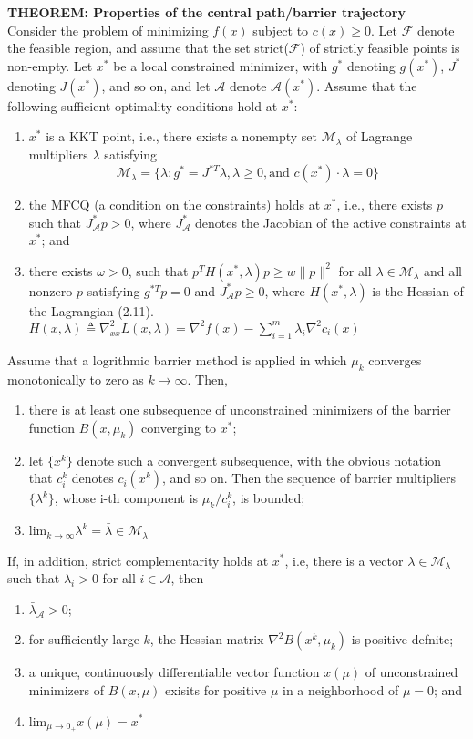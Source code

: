 \documentclass[14pt]{extreport}
\begin{document}
\textbf{THEOREM: Properties of the central path/barrier trajectory}\\
Consider the problem of minimizing $f(x)$ subject to $c(x) \ge 0$. Let $\mathcal{F}$ denote the feasible region, and assume that the set strict($\mathcal{F}$) of strictly feasible points is non-empty. Let $x^*$ be a local constrained minimizer, with $g^*$ denoting $g(x^*)$, $J^*$ denoting $J(x^*)$, and so on, and let $\mathcal{A}$ denote $\mathcal{A}(x^*)$. Assume that the following sufficient optimality conditions hold at $x^*$:
\begin{enumerate}[label=(\alph*)]
	\item $x^*$ is a KKT point, i.e., there exists a nonempty set $\mathcal{M}_{\lambda}$ of Lagrange multipliers $\lambda$ satisfying 
	$$\mathcal{M}_{\lambda} = \{ \lambda: g^* = J^{*T}\lambda, \lambda \ge 0, \text{and } c(x^*)\cdot \lambda = 0 \}$$
	\item the MFCQ (a condition on the constraints) holds at $x^*$, i.e., there exists $p$ such that $J^*_{\mathcal{A}}p > 0$, where $J^*_{\mathcal{A}}$ denotes the Jacobian of the active constraints at $x^*$; and
	\item there exists $\omega > 0$, such that $p^T H(x^*, \lambda)p \ge w \| p\|^2 $ for all $\lambda \in \mathcal{M}_{\lambda}$ and all nonzero $p$ satisfying $g^{*T}p=0$ and $J^*_{\mathcal{A}} p \ge 0$, where $H(x^*, \lambda)$ is the Hessian of the Lagrangian (2.11). $H(x, \lambda) \triangleq \nabla^2_{xx} L(x, \lambda) =  \nabla^2 f(x) - \sum_{i=1}^{m} \lambda_i \nabla^2 c_i(x)$
\end{enumerate}
	Assume that a logrithmic barrier method is applied in which $\mu_{k}$ converges monotonically to zero as $k \to \infty$. Then, 
	\begin{enumerate}[label=(\roman*)]
		\item there is at least one subsequence of unconstrained minimizers of the barrier function $B(x, \mu_k)$ converging to $x^*$; 
		\item let $\{ x^k\}$ denote such a convergent subsequence, with the obvious notation that $c_i^k$ denotes $c_i(x^k)$, and so on. Then the sequence of barrier multipliers $\{ \lambda^{k}\}$, whose i-th component is $\mu_k / c_i^k$, is bounded;
		\item $\text{lim}_{k \to \infty} \lambda^k = \bar{\lambda} \in \mathcal{M}_{\lambda}$
	\end{enumerate} 
	If, in addition, strict complementarity holds at $x^*$, i.e, there is a vector $\lambda \in \mathcal{M}_{\lambda}$ such that $\lambda_i > 0$ for all $i \in \mathcal{A}$, then
	\begin{enumerate}[label=(\roman*)]
		\addtocounter{enumi}{3}
		\item $\bar{\lambda}_{\mathcal{A}} > 0$;
		\item for sufficiently large $k$, the Hessian matrix $\nabla^2 B(x^k, \mu_k)$ is positive defnite;
		\item a unique, continuously differentiable vector function $x(\mu)$ of unconstrained minimizers of $B(x,\mu)$ exisits for positive $\mu$ in a neighborhood of $\mu=0$; and 
		\item $\text{lim}_{\mu \to 0_{+}} x(\mu) = x^*$
	\end{enumerate}
\end{document}
